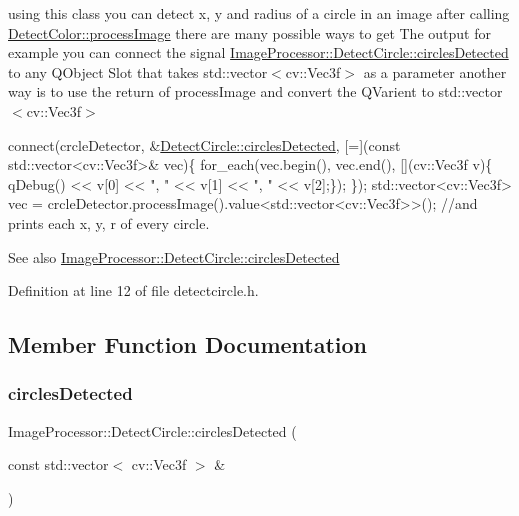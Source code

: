 using this class you can detect x, y and radius of a circle in an image after calling \hyperlink{class_image_processor_1_1_detect_color_afb14622f8e1390f1cf887cc8bf1da568}{Detect\+Color\+::process\+Image} there are many possible ways to get The output for example you can connect the signal \hyperlink{class_image_processor_1_1_detect_circle_a2c399b3380a2830317c701d47d4db004}{Image\+Processor\+::\+Detect\+Circle\+::circles\+Detected} to any Q\+Object Slot that takes std\+::vector$<$cv\+::\+Vec3f$>$ as a parameter another way is to use the return of process\+Image and convert the Q\+Varient to std\+::vector$<$cv\+::\+Vec3f$>$ 
\begin{DoxyCode}
 connect(crcleDetector, &\hyperlink{class_image_processor_1_1_detect_circle_a2c399b3380a2830317c701d47d4db004}{DetectCircle::circlesDetected}, [=](\textcolor{keyword}{const} 
      std::vector<cv::Vec3f>& vec)\{
     for\_each(vec.begin(), vec.end(), [](cv::Vec3f v)\{ qDebug() << v[0] << \textcolor{stringliteral}{", "} << v[1] << \textcolor{stringliteral}{", "} << v[2];\});
\});
 std::vector<cv::Vec3f> vec = crcleDetector.processImage().value<std::vector<cv::Vec3f>>(); \textcolor{comment}{//and prints
       each x, y, r of every circle.}
\end{DoxyCode}
 \begin{DoxySeeAlso}{See also}
\hyperlink{class_image_processor_1_1_detect_circle_a2c399b3380a2830317c701d47d4db004}{Image\+Processor\+::\+Detect\+Circle\+::circles\+Detected} 
\end{DoxySeeAlso}


Definition at line 12 of file detectcircle.\+h.



\subsection{Member Function Documentation}
\mbox{\label{class_image_processor_1_1_detect_circle_a2c399b3380a2830317c701d47d4db004}} 
\subsubsection{\texorpdfstring{circles\+Detected}{circlesDetected}}
{\footnotesize\ttfamily Image\+Processor\+::\+Detect\+Circle\+::circles\+Detected (\begin{DoxyParamCaption}\item[{const std\+::vector$<$ cv\+::\+Vec3f $>$ \&}]{ }\end{DoxyParamCaption})\hspace{0.3cm}{\ttfamily [signal]}}



